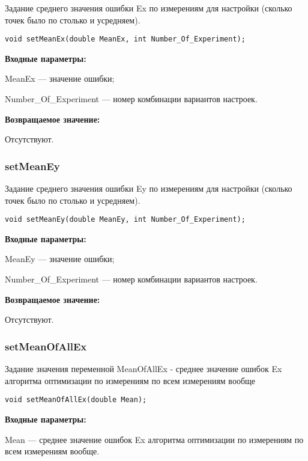 \documentclass[a4paper,12pt]{article}
\begin{document}
Задание среднего значения ошибки Ex по измерениям для настройки (сколько точек было по столько и усредняем).


\begin{lstlisting}[label=code_syntax_setMeanEx,caption=Синтаксис]
void setMeanEx(double MeanEx, int Number_Of_Experiment);
\end{lstlisting}

\textbf{Входные параметры:}

MeanEx --- значение ошибки;
 
    Number\_Of\_Experiment --- номер комбинации вариантов настроек.

\textbf{Возвращаемое значение:}

Отсутствуют.


\subsubsection{setMeanEy}\label{setMeanEy}

Задание среднего значения ошибки Ey по измерениям для настройки (сколько точек было по столько и усредняем).


\begin{lstlisting}[label=code_syntax_setMeanEy,caption=Синтаксис]
void setMeanEy(double MeanEy, int Number_Of_Experiment);
\end{lstlisting}

\textbf{Входные параметры:}

MeanEy --- значение ошибки;
 
    Number\_Of\_Experiment --- номер комбинации вариантов настроек.

\textbf{Возвращаемое значение:}

Отсутствуют.


\subsubsection{setMeanOfAllEx}\label{setMeanOfAllEx}

Задание значения переменной MeanOfAllEx - среднее значение ошибок Ex алгоритма оптимизации по измерениям по всем измерениям вообще


\begin{lstlisting}[label=code_syntax_setMeanOfAllEx,caption=Синтаксис]
void setMeanOfAllEx(double Mean);
\end{lstlisting}

\textbf{Входные параметры:}

Mean --- среднее значение ошибок Ex алгоритма оптимизации по измерениям по всем измерениям вообще.
\end{document}
